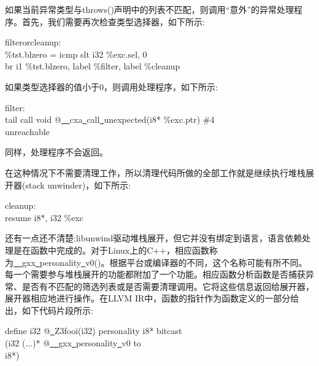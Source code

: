 如果当前异常类型与throws()声明中的列表不匹配，则调用“意外”的异常处理程序。首先，我们需要再次检查类型选择器，如下所示:\par

\begin{tcolorbox}[colback=white,colframe=black]
filterorcleanup: \\
\%tst.blzero = icmp slt i32 \%exc.sel, 0 \\
br i1 \%tst.blzero, label \%filter, label \%cleanup
\end{tcolorbox}

如果类型选择器的值小于0，则调用处理程序，如下所示:

\begin{tcolorbox}[colback=white,colframe=black]
filter: \\
tail call void @\underline{~~}cxa\underline{~}call\underline{~}unexpected(i8* \%exc.ptr) \#4 \\
unreachable
\end{tcolorbox}

同样，处理程序不会返回。\par

在这种情况下不需要清理工作，所以清理代码所做的全部工作就是继续执行堆栈展开器(stack unwinder)，如下所示:\par

\begin{tcolorbox}[colback=white,colframe=black]
cleanup: \\
resume { i8*, i32 } \%exc
\end{tcolorbox}

还有一点还不清楚:libunwind驱动堆栈展开，但它并没有绑定到语言，语言依赖处理是在函数中完成的。对于Linux上的C++，相应函数称为\underline{~~}gxx\underline{~}personality\underline{~}v0()。根据平台或编译器的不同，这个名称可能有所不同。每一个需要参与堆栈展开的功能都附加了一个功能。相应函数分析函数是否捕获异常、是否有不匹配的筛选列表或是否需要清理调用。它将这些信息返回给展开器，展开器相应地进行操作。在LLVM IR中，函数的指针作为函数定义的一部分给出，如下代码片段所示:\par

\begin{tcolorbox}[colback=white,colframe=black]
define i32 @\underline{~}Z3fooi(i32) personality i8* bitcast \\
\hspace*{3cm}(i32 (...)* @\underline{~~}gxx\underline{~}personality\underline{~}v0 to \\
\hspace*{3cm}i8*)
\end{tcolorbox}

